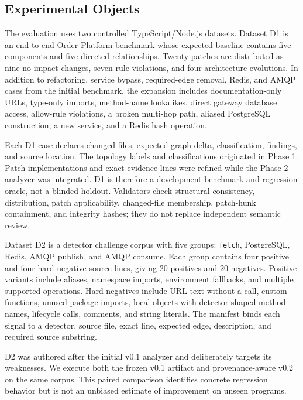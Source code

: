 \documentclass[conference]{IEEEtran}
\begin{document}
\subsection{Experimental Objects}

The evaluation uses two controlled TypeScript/Node.js datasets. Dataset D1 is an end-to-end Order Platform benchmark whose expected baseline contains five components and five directed relationships. Twenty patches are distributed as nine no-impact changes, seven rule violations, and four architecture evolutions. In addition to refactoring, service bypass, required-edge removal, Redis, and AMQP cases from the initial benchmark, the expansion includes documentation-only URLs, type-only imports, method-name lookalikes, direct gateway database access, allow-rule violations, a broken multi-hop path, aliased PostgreSQL construction, a new service, and a Redis hash operation.

Each D1 case declares changed files, expected graph delta, classification, findings, and source location. The topology labels and classifications originated in Phase 1. Patch implementations and exact evidence lines were refined while the Phase 2 analyzer was integrated. D1 is therefore a development benchmark and regression oracle, not a blinded holdout. Validators check structural consistency, distribution, patch applicability, changed-file membership, patch-hunk containment, and integrity hashes; they do not replace independent semantic review.

Dataset D2 is a detector challenge corpus with five groups: \texttt{fetch}, PostgreSQL, Redis, AMQP publish, and AMQP consume. Each group contains four positive and four hard-negative source lines, giving 20 positives and 20 negatives. Positive variants include aliases, namespace imports, environment fallbacks, and multiple supported operations. Hard negatives include URL text without a call, custom functions, unused package imports, local objects with detector-shaped method names, lifecycle calls, comments, and string literals. The manifest binds each signal to a detector, source file, exact line, expected edge, description, and required source substring.

D2 was authored after the initial v0.1 analyzer and deliberately targets its weaknesses. We execute both the frozen v0.1 artifact and provenance-aware v0.2 on the same corpus. This paired comparison identifies concrete regression behavior but is not an unbiased estimate of improvement on unseen programs.
\end{document}
